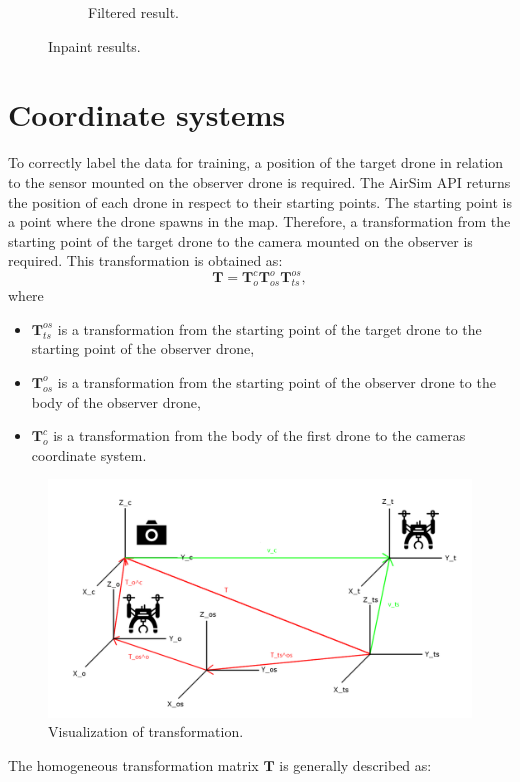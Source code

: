 \documentclass[twoside]{ctuthesis}
\theoremstyle{plain}
\theoremstyle{definition}
\theoremstyle{note}
\begin{document}
\begin{figure}
\begin{subfigure}[b]{0.3\textwidth}
		\caption{Filtered result.}
	\end{subfigure}
	\caption{Inpaint results.}
	\label{fig:inpaint_results}
\end{figure}
\section{Coordinate systems}
To correctly label the data for training, a position of the target drone in relation to the sensor mounted on the observer drone is required. The AirSim API returns the position of each drone in respect to their starting points. The starting point is a point where the drone spawns in the map. Therefore, a transformation from the starting point of the target drone to the camera mounted on the observer is required. This transformation is obtained as:
\begin{equation}
	\textbf{T}=\textbf{T}_{o}^{c}\textbf{T}_{os}^{o}\textbf{T}_{ts}^{os},
\end{equation}
where
\begin{itemize}
	\item $\textbf{T}_{ts}^{os}$ is a transformation from the starting point of the target drone to the starting point of the observer drone,
	\item $\textbf{T}_{os}^{o}$ is a transformation from the starting point of the observer drone to the body of the observer drone,
	\item $\textbf{T}_{o}^{c}$ is a transformation from the body of the first drone to the cameras coordinate system.
\end{itemize}
\begin{figure}
	\centering
	\includegraphics[width=\textwidth]{coord_schema.png}
	\caption{Visualization of transformation.}
	\label{fig:trans}
\end{figure}
The homogeneous transformation matrix $\textbf{T}$ is generally described as:
\end{document}
